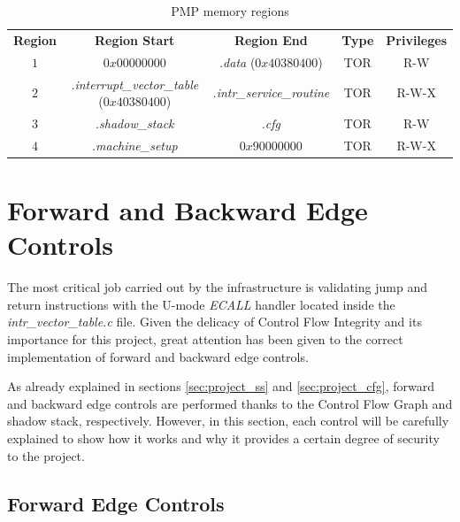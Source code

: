 \begin{table}
  \centering
  \begin{tabular}{|c|c|c|c|c|}
    \hline
    \textbf{Region}    & \textbf{Region Start}                             & \textbf{Region End}              & \textbf{Type} & \textbf{Privileges} \\
    \hhline{=====} $1$ & $0x00000000$                                      & \textit{.data} ($0x40380400$)    & TOR           & R-W                 \\
    \hline
    $2$                & \textit{.interrupt\_vector\_table} ($0x40380400$) & \textit{.intr\_service\_routine} & TOR           & R-W-X               \\
    \hline
    $3$                & \textit{.shadow\_stack}                           & \textit{.cfg}                    & TOR           & R-W                 \\
    \hline
    $4$                & \textit{.machine\_setup}                          & $0x90000000$                     & TOR           & R-W-X               \\
    \hline
  \end{tabular}
  \caption{PMP memory regions}
  \label{tab:pmpregions}
\end{table}

\section{Forward and Backward Edge Controls}
\label{sec:project_controls}

The most critical job carried out by the infrastructure is validating jump and return
instructions with the U-mode \textit{ECALL} handler located inside the \textit{intr\_vector\_table.c}
file. Given the delicacy of Control Flow Integrity and its importance for this
project, great attention has been given to the correct implementation of forward
and backward edge controls.

As already explained in sections \ref{sec:project_ss} and \ref{sec:project_cfg},
forward and backward edge controls are performed thanks to the Control Flow
Graph and shadow stack, respectively. However, in this section, each control
will be carefully explained to show how it works and why it provides a certain
degree of security to the project.

\subsection{Forward Edge Controls}
\label{subsec:forward}

